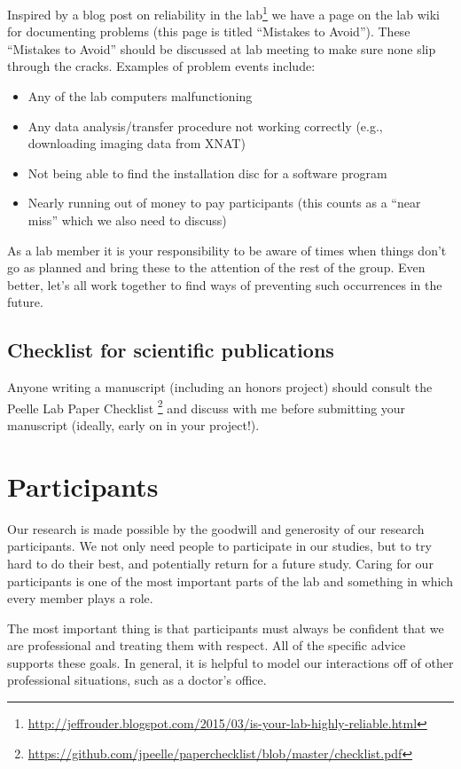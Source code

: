 \documentclass[letterpaper,11pt,oneside]{memoir}
\begin{document}
Inspired by a blog post on reliability in the lab\footnote{\url{http://jeffrouder.blogspot.com/2015/03/is-your-lab-highly-reliable.html}} we have a page on the lab wiki for documenting problems (this page is titled ``Mistakes to Avoid''). These ``Mistakes to Avoid'' should be discussed at lab meeting to make sure none slip through the cracks. Examples of problem events include:

\begin{itemize}
\item Any of the lab computers malfunctioning
\item Any data analysis/transfer procedure not working correctly (e.g., downloading imaging data from XNAT)
\item Not being able to find the installation disc for a software program
\item Nearly running out of money to pay participants (this counts as a ``near miss'' which we also need to discuss)
\end{itemize}

As a lab member it is your responsibility to be aware of times when things don't go as planned and bring these to the attention of the rest of the group. Even better, let's all work together to find ways of preventing such occurrences in the future.


\subsection{Checklist for scientific publications}

Anyone writing a manuscript (including an honors project) should consult the Peelle Lab Paper Checklist \footnote{\url{https://github.com/jpeelle/paperchecklist/blob/master/checklist.pdf}} and discuss with me before submitting your manuscript (ideally, early on in your project!).


\section{Participants}
\label{sec:participants}

Our research is made possible by the goodwill and generosity of our research participants. We not only need people to participate in our studies, but to try hard to do their best, and potentially return for a future study. Caring for our participants is one of the most important parts of the lab and something in which every member plays a role.

The most important thing is that participants must always be confident that we are professional and treating them with respect. All of the specific advice supports these goals. In general, it is helpful to model our interactions off of other professional situations, such as a doctor's office.
\end{document}
